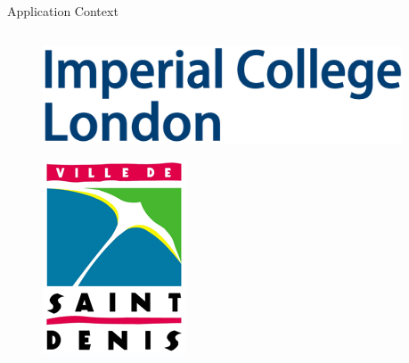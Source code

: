 \begin{frame}{Application Context}
\begin{columns}
\begin{column}{.10\linewidth}
\begin{figure}
	\includegraphics[width=\textwidth]{assets/icl.png}
\end{figure}
\begin{figure}
	\includegraphics[width=\textwidth]{assets/saintDenis.png}
\end{figure}
\end{column}
\begin{column}[l]{.68\linewidth}

\end{column}
\end{columns}
\end{frame}
